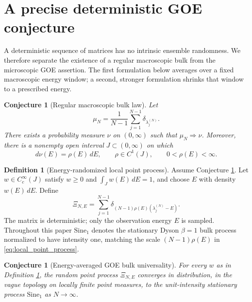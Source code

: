 \documentclass[11pt]{amsart}
\numberwithin{equation}{section}
\theoremstyle{plain}
\newtheorem{conjecture}[theorem]{Conjecture}
\theoremstyle{definition}
\newtheorem{definition}[theorem]{Definition}
\theoremstyle{remark}
\begin{document}
\section{A precise deterministic GOE conjecture}
\label{sec:goe_conjecture}

A deterministic sequence of matrices has no intrinsic ensemble randomness.  We therefore separate the existence of a regular macroscopic bulk from the microscopic GOE assertion.  The first formulation below averages over a fixed macroscopic energy window; a second, stronger formulation shrinks that window to a prescribed energy.

\begin{conjecture}[Regular macroscopic bulk law]
\label{conj:bulk_density}
Let
\begin{equation}
\mu_N=\frac{1}{N-1}\sum_{j=1}^{N-1}\delta_{\lambda_j^{(N)}}.
\label{eq:empirical_spectral_measure}
\end{equation}
There exists a probability measure $\nu$ on $(0,\infty)$ such that $\mu_N\Rightarrow\nu$.  Moreover, there is a nonempty open interval $J\subset(0,\infty)$ on which
\begin{equation}
d\nu(E)=\rho(E)\,dE,
\qquad
\rho\in C^1(J),
\qquad
0<\rho(E)<\infty.
\label{eq:regular_bulk_density}
\end{equation}
\end{conjecture}

\begin{definition}[Energy-randomized local point process]
\label{def:energy_randomized_process}
Assume Conjecture \ref{conj:bulk_density}.  Let $w\in C_c^\infty(J)$ satisfy $w\ge0$ and $\int_Jw(E)\,dE=1$, and choose $E$ with density $w(E)\,dE$.  Define
\begin{equation}
\Xi_{N,E}
=
\sum_{j=1}^{N-1}
\delta_{(N-1)\rho(E)(\lambda_j^{(N)}-E)}.
\label{eq:local_point_process}
\end{equation}
The matrix is deterministic; only the observation energy $E$ is sampled.  Throughout this paper $\mathrm{Sine}_1$ denotes the stationary Dyson $\beta=1$ bulk process normalized to have intensity one, matching the scale $(N-1)\rho(E)$ in \eqref{eq:local_point_process}.
\end{definition}

\begin{conjecture}[Energy-averaged GOE bulk universality]
\label{conj:goe_bulk_universality}
For every $w$ as in Definition \ref{def:energy_randomized_process}, the random point process $\Xi_{N,E}$ converges in distribution, in the vague topology on locally finite point measures, to the unit-intensity stationary process $\mathrm{Sine}_1$ as $N\to\infty$.
\end{conjecture}
\end{document}
